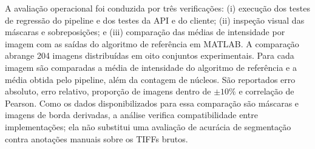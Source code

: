 A avaliação operacional foi conduzida por três verificações: (i) execução dos testes de regressão do pipeline e dos testes da API e do cliente; (ii) inspeção visual das máscaras e sobreposições; e (iii) comparação das médias de intensidade por imagem com as saídas do algoritmo de referência em MATLAB. A comparação abrange 204 imagens distribuídas em oito conjuntos experimentais. Para cada imagem são comparadas a média de intensidade do algoritmo de referência e a média obtida pelo pipeline, além da contagem de núcleos. São reportados erro absoluto, erro relativo, proporção de imagens dentro de $\pm 10\%$ e correlação de Pearson. Como os dados disponibilizados para essa comparação são máscaras e imagens de borda derivadas, a análise verifica compatibilidade entre implementações; ela não substitui uma avaliação de acurácia de segmentação contra anotações manuais sobre os TIFFs brutos.
